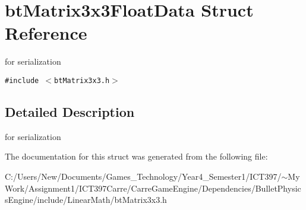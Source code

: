 \hypertarget{structbt_matrix3x3_float_data}{
\section{btMatrix3x3FloatData Struct Reference}
\label{structbt_matrix3x3_float_data}
}
for serialization  


{\tt \#include $<$btMatrix3x3.h$>$}



\subsection{Detailed Description}
for serialization 

The documentation for this struct was generated from the following file:\begin{CompactItemize}
\item 
C:/Users/New/Documents/Games\_\-Technology/Year4\_\-Semester1/ICT397/$\sim$My Work/Assignment1/ICT397Carre/CarreGameEngine/Dependencies/BulletPhysicsEngine/include/LinearMath/btMatrix3x3.h\end{CompactItemize}

